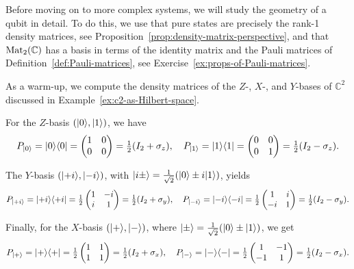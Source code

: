 \documentclass[a4paper, oneside, 12pt]{amsart}
\begin{document}
Before moving on to more complex systems, we will study the geometry of a qubit in detail.
To do this, we use that pure states are precisely the rank-1 density matrices, see Proposition~\ref{prop:density-matrix-perspective}, and that \( \operatorname{Mat}_2(\mathbb{C}) \) has a basis in terms of the identity matrix and the Pauli matrices of Definition~\ref{def:Pauli-matrices}, see Exercise~\ref{ex:props-of-Pauli-matrices}.

\begin{example}\label{ex:density-matrices-of-some-bases}
  As a warm-up, we compute the density matrices of the \( Z \)-, \( X \)-, and \( Y \)-bases of \( \mathbb{C}^2 \) discussed in Example~\ref{ex:c2-as-Hilbert-space}.

  For the \( Z \)-basis \( (\lvert0\rangle, \lvert1\rangle) \), we have
  \begin{equation*}
    P_{\lvert0\rangle} = \lvert0\rangle\langle0\rvert = \begin{pmatrix} 1 & 0 \\ 0 & 0 \end{pmatrix} = \tfrac{1}{2}(I_2 + \sigma_z), \quad
    P_{\lvert1\rangle} = \lvert1\rangle\langle1\rvert = \begin{pmatrix} 0 & 0 \\ 0 & 1 \end{pmatrix} = \tfrac{1}{2}(I_2 - \sigma_z).
  \end{equation*}

  The \( Y \)-basis \( (\lvert+i\rangle, \lvert-i\rangle) \), with \( \lvert i\pm\rangle = \frac{1}{\sqrt{2}}(\lvert0\rangle \pm i\lvert1\rangle) \), yields
  \begin{equation*}
    P_{\lvert+i\rangle} = \lvert+i\rangle\langle+i\rvert = \tfrac{1}{2} \begin{pmatrix} 1 & -i \\ i & 1 \end{pmatrix} = \tfrac{1}{2}(I_2 + \sigma_y), \quad
    P_{\lvert-i\rangle} = \lvert-i\rangle\langle-i\rvert = \tfrac{1}{2} \begin{pmatrix} 1 & i \\ -i & 1 \end{pmatrix} = \tfrac{1}{2}(I_2 - \sigma_y).
  \end{equation*}


  Finally, for the \( X \)-basis \( (\lvert+\rangle, \lvert-\rangle) \), where \( \lvert\pm\rangle = \frac{1}{\sqrt{2}}(\lvert0\rangle \pm \lvert1\rangle) \), we get
  \begin{equation*}
    P_{\lvert+\rangle} = \lvert+\rangle\langle+\rvert = \tfrac{1}{2} \begin{pmatrix} 1 & 1 \\ 1 & 1 \end{pmatrix} = \tfrac{1}{2}(I_2 + \sigma_x), \quad
    P_{\lvert-\rangle} = \lvert-\rangle\langle-\rvert = \tfrac{1}{2} \begin{pmatrix} 1 & -1 \\ -1 & 1 \end{pmatrix} = \tfrac{1}{2}(I_2 - \sigma_x).
  \end{equation*}
\end{example}
\end{document}
